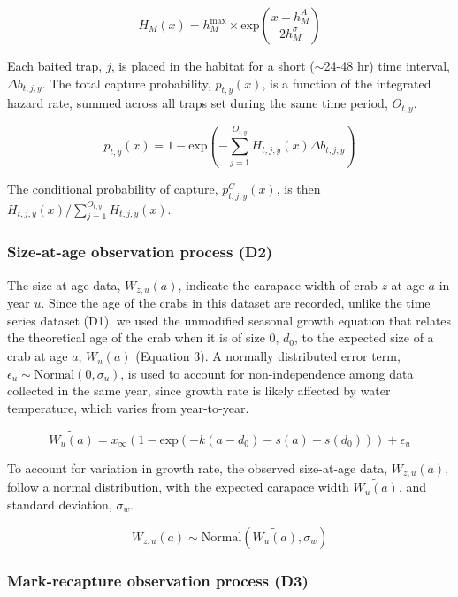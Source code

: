 \documentclass{article}
\begin{document}
\begin{equation}
H_M(x) = h^{\text{max}}_M \times \text{exp}(\frac{x-h^{A}_M}{2 h^{\sigma}_M})
\end{equation}

Each baited trap, $j$, is placed in the habitat for a short ($\sim$24-48 hr) time interval, $\Delta b_{t,j,y}$. The total capture probability, $p_{t,y}(x)$, is a function of the integrated hazard rate, summed across all traps set during the same time period, $O_{t,y}$.

\begin{equation}
p_{t,y}(x) = 1-\text{exp}\left(-\sum_{j=1}^{O_{t,y}} H_{t,j,y}(x)\Delta b_{t,j,y}\right)
\end{equation}

The conditional probability of capture, $p^C_{t,j,y}(x)$, is then $H_{t,j,y}(x)/\sum_{j=1}^{O_{t,y}}H_{t,j,y}(x)$.

\subsubsection*{Size-at-age observation process (D2)}

The size-at-age data, $W_{z,u}(a)$, indicate the carapace width of crab $z$ at age $a$ in year $u$. Since the age of the crabs in this dataset are recorded, unlike the time series dataset (D1), we used the unmodified seasonal growth equation that relates the theoretical age of the crab when it is of size 0, $d_0$, to the expected size of a crab at age $a$, $\widetilde{W_u(a)}$ (Equation 3). A normally distributed error term, $\epsilon_u \sim \text{Normal}(0, \sigma_u)$, is used to account for non-independence among data collected in the same year, since growth rate is likely affected by water temperature, which varies from year-to-year.

\begin{equation}
\widetilde{W_u(a)} = x_{\infty}(1-\text{exp}(-k(a-d_0) - s(a) + s(d_0))) + \epsilon_u
\end{equation}

To account for variation in growth rate, the observed size-at-age data, $W_{z,u}(a)$, follow a normal distribution, with the expected carapace width $\widetilde{W_u(a)}$, and standard deviation, $\sigma_{w}$.

\begin{equation}
W_{z,u}(a) \sim \text{Normal}(\widetilde{W_u(a)}, \sigma_{w})
\end{equation}

\subsubsection*{Mark-recapture observation process (D3)}
\end{document}
